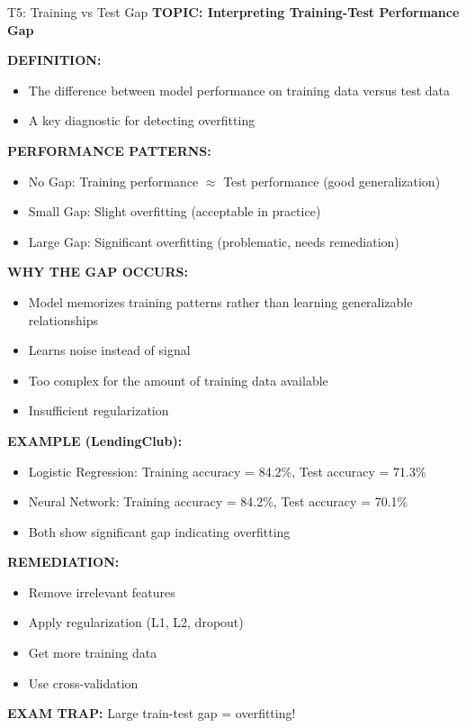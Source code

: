 \documentclass[8pt]{beamer}
\begin{document}
	\begin{frame}{T5: Training vs Test Gap}
		\fontsize{6.5}{7.5}\selectfont
		\textbf{TOPIC: Interpreting Training-Test Performance Gap}
		
		\vspace{0.1cm}
		\textbf{DEFINITION:}
		\begin{itemize}
			\item The difference between model performance on training data versus test data
			\item A key diagnostic for detecting overfitting
		\end{itemize}
		
		\vspace{0.1cm}
		\textbf{PERFORMANCE PATTERNS:}
		\begin{itemize}
			\item \textcolor{mygreen}{No Gap:} Training performance $\approx$ Test performance (good generalization)
			\item \textcolor{myorange}{Small Gap:} Slight overfitting (acceptable in practice)
			\item \textcolor{myred}{Large Gap:} Significant overfitting (problematic, needs remediation)
		\end{itemize}
		
		\vspace{0.1cm}
		\textbf{WHY THE GAP OCCURS:}
		\begin{itemize}
			\item Model memorizes training patterns rather than learning generalizable relationships
			\item Learns noise instead of signal
			\item Too complex for the amount of training data available
			\item Insufficient regularization
		\end{itemize}
		
		\vspace{0.1cm}
		\textbf{EXAMPLE (LendingClub):}
		\begin{itemize}
			\item Logistic Regression: Training accuracy = 84.2\%, Test accuracy = 71.3\%
			\item Neural Network: Training accuracy = 84.2\%, Test accuracy = 70.1\%
			\item Both show significant gap indicating overfitting
		\end{itemize}
		
		\vspace{0.1cm}
		\textbf{REMEDIATION:}
		\begin{itemize}
			\item Remove irrelevant features
			\item Apply regularization (L1, L2, dropout)
			\item Get more training data
			\item Use cross-validation
		\end{itemize}
		
		\textcolor{myred}{\textbf{EXAM TRAP:}} Large train-test gap = \textcolor{myblue}{overfitting}!
	\end{frame}
	
\end{document}
